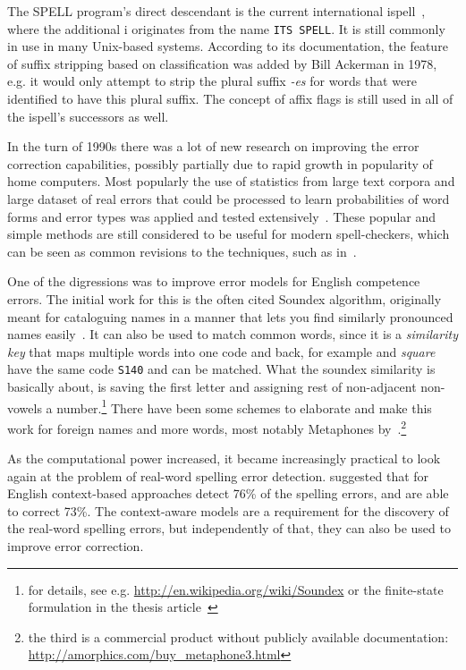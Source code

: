 \documentclass[officiallayout]{unihelcompling}
\newcommand\misspelt{\bgroup\markoverwith
{\textcolor{red}{\lower3.5pt\hbox{\sixly \char58}}}\ULon}
\begin{document}
The SPELL program's direct descendant is the current international
ispell~\citep{gorin1971spell}, where the additional i originates from the name
\texttt{ITS SPELL}. It is still commonly in use in many Unix-based systems.
According to its documentation, the feature of suffix stripping based on
classification was added by Bill Ackerman in 1978, e.g. it would only attempt
to strip the plural suffix \emph{-es} for words that were identified to have
this plural suffix.  The concept of affix flags is still used in all of the
ispell's successors as well.

In the turn of 1990s there was a lot of new research on improving the error
correction capabilities, possibly partially due to rapid growth in popularity
of home computers. Most popularly the use of statistics from large text corpora
and large dataset of real errors that could be processed to learn probabilities
of word forms and error types was applied and tested
extensively~\citep{kernighan1990spelling,church1991probability}. These popular
and simple methods are still considered to be useful for modern spell-checkers,
which can be seen as common revisions to the techniques, such as
in~\citet{brill2000improved}.

One of the digressions was to improve \glspl{error model} for English
competence errors. The initial work for this is the often cited Soundex
algorithm, originally meant for cataloguing names in a manner that lets you
find similarly pronounced names easily~\citep{russell1918soundex}. It can also
be used to match common words, since it is a \emph{similarity key} that maps
multiple words into one code and back, for example \misspelt{squer} and
\emph{square} have the same code \texttt{S140} and can be matched.  What the
soundex similarity is basically about, is saving the first letter and assigning
rest of non-adjacent non-vowels a number.\footnote{for details, see e.g.
\url{http://en.wikipedia.org/wiki/Soundex} or the finite-state formulation in
the thesis article~} There have been some
schemes to elaborate and make this work for foreign names and more words, most
notably Metaphones
by~\citet{philips1990hanging,philips2000double}.\footnote{the third is a
commercial product without publicly available documentation:
\url{http://amorphics.com/buy_metaphone3.html}}

As the computational power increased, it became increasingly practical to look
again at the problem of real-word spelling error detection.
\citet{mays1991context} suggested that for English context-based
approaches detect 76\% of the spelling errors, and are able to correct 73\%.
The context-aware models are a requirement for the discovery of the real-word
spelling errors, but independently of that, they can also be used to improve
error correction. 
\end{document}
